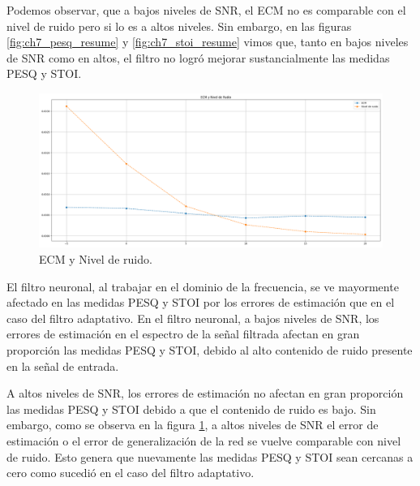 Podemos observar, que a bajos niveles de SNR, el ECM no es comparable con el nivel de ruido pero si lo es a altos niveles. Sin embargo, en las figuras \ref{fig:ch7_pesq_resume} y \ref{fig:ch7_stoi_resume} vimos que, tanto en bajos niveles de SNR como en altos, el filtro no logró mejorar sustancialmente las medidas PESQ y STOI.

\begin{figure}
	\centering
	\centerline{\includegraphics[scale=0.30]{images/ch7/ecm_and_noise_level.png}}
	\caption{ECM y Nivel de ruido.}
	\label{fig:ch7_mse_and_noise_level}
\end{figure}


El filtro neuronal, al trabajar en el dominio de la frecuencia, se ve mayormente afectado en las medidas PESQ y STOI por los errores de estimación que en el caso del filtro adaptativo. En el filtro neuronal, a bajos niveles de SNR, los errores de estimación en el espectro de la señal filtrada  afectan en gran proporción las medidas PESQ y STOI, debido al alto contenido de ruido presente en la señal de entrada.

A altos niveles de SNR, los errores de estimación no afectan en gran proporción las medidas PESQ y STOI debido a que el contenido de ruido es bajo. Sin embargo, como se observa en la figura \ref{fig:ch7_mse_and_noise_level}, a altos niveles de SNR el error de estimación o el error de generalización de la red \cite{deep_learning} se vuelve comparable con nivel de ruido. Esto genera que nuevamente las medidas PESQ y STOI sean cercanas a cero como sucedió en el caso del filtro adaptativo.